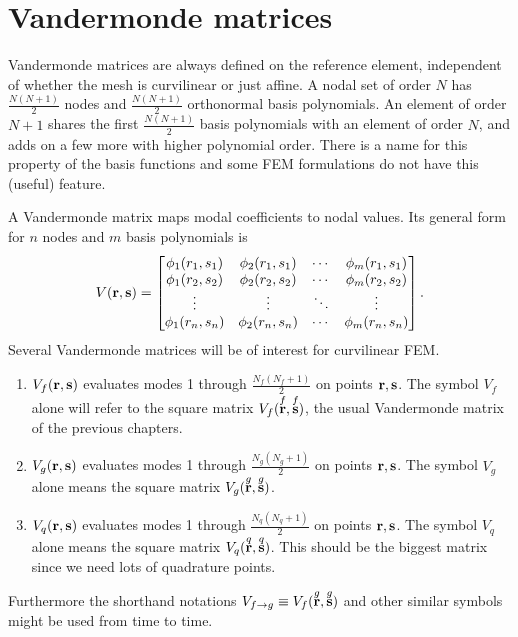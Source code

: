 \section{Vandermonde matrices}

Vandermonde matrices are always defined on the reference element, independent of whether the mesh is curvilinear or just affine.  A nodal set of order $N$ has $\frac{N(N+1)}{2}$ nodes and $\frac{N(N+1)}{2}$ orthonormal basis polynomials.  An element of order $N+1$ shares the first $\frac{N(N+1)}{2}$ basis polynomials with an element of order $N$, and adds on a few more with higher polynomial order.  There is a name for this property of the basis functions and some FEM formulations do not have this (useful) feature.

A Vandermonde matrix maps modal coefficients to nodal values.  Its general form for $n$ nodes and $m$ basis polynomials is
%
\begin{equation}
V(\textbf{r}, \textbf{s}) =
\begin{bmatrix}
\phi_1(r_1, s_1) & \phi_2(r_1, s_1) & \cdots & \phi_m(r_1, s_1) \\
\phi_1(r_2, s_2) & \phi_2(r_2, s_2) & \cdots & \phi_m(r_2, s_2) \\
\vdots & \vdots & \ddots & \vdots \\
\phi_1(r_n, s_n) & \phi_2(r_n, s_n) & \cdots & \phi_m(r_n, s_n)
\end{bmatrix}.
\end{equation}
%
Several Vandermonde matrices will be of interest for curvilinear FEM.
%
\begin{enumerate}
  \item $V_f(\textbf{r}, \textbf{s})$ evaluates modes 1 through $\frac{N_f(N_f+1)}{2}$ on points $\textbf{r}, \textbf{s}$.  The symbol $V_f$ alone will refer to the square matrix $V_f(\overset{f}{\textbf{r}}, \overset{f}{\textbf{s}})$, the usual Vandermonde matrix of the previous chapters.
  \item $V_g(\textbf{r}, \textbf{s})$ evaluates modes 1 through $\frac{N_g(N_g+1)}{2}$ on points $\textbf{r}, \textbf{s}$.  The symbol $V_g$ alone means the square matrix $V_g(\overset{g}{\textbf{r}}, \overset{g}{\textbf{s}})$.
  \item $V_q(\textbf{r}, \textbf{s})$ evaluates modes 1 through $\frac{N_q(N_q+1)}{2}$ on points $\textbf{r}, \textbf{s}$.  The symbol $V_q$ alone means the square matrix $V_q(\overset{q}{\textbf{r}}, \overset{q}{\textbf{s}})$.  This should be the biggest matrix since we need lots of quadrature points.
\end{enumerate}
%
Furthermore the shorthand notations $V_{f \rightarrow g} \equiv V_f(\overset{g}{\textbf{r}}, \overset{g}{\textbf{s}})$ and other similar symbols might be used from time to time.

